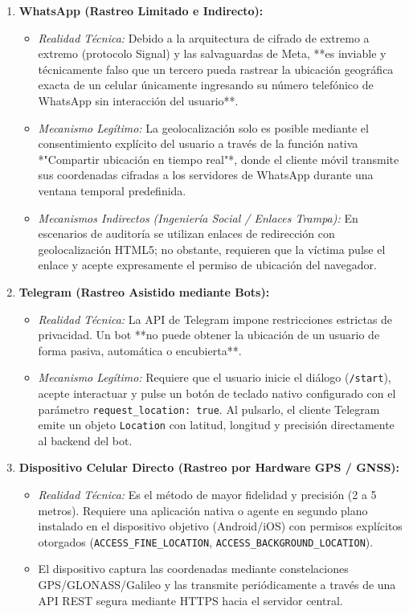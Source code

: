 \documentclass[11pt,letterpaper]{article}
\begin{document}
\begin{enumerate}
    \item \textbf{WhatsApp (Rastreo Limitado e Indirecto):}
    \begin{itemize}
        \item \textit{Realidad Técnica:} Debido a la arquitectura de cifrado de extremo a extremo (protocolo Signal) y las salvaguardas de Meta, **es inviable y técnicamente falso que un tercero pueda rastrear la ubicación geográfica exacta de un celular únicamente ingresando su número telefónico de WhatsApp sin interacción del usuario**.
        \item \textit{Mecanismo Legítimo:} La geolocalización solo es posible mediante el consentimiento explícito del usuario a través de la función nativa *"Compartir ubicación en tiempo real"*, donde el cliente móvil transmite sus coordenadas cifradas a los servidores de WhatsApp durante una ventana temporal predefinida.
        \item \textit{Mecanismos Indirectos (Ingeniería Social / Enlaces Trampa):} En escenarios de auditoría se utilizan enlaces de redirección con geolocalización HTML5; no obstante, requieren que la víctima pulse el enlace y acepte expresamente el permiso de ubicación del navegador.
    \end{itemize}

    \item \textbf{Telegram (Rastreo Asistido mediante Bots):}
    \begin{itemize}
        \item \textit{Realidad Técnica:} La API de Telegram impone restricciones estrictas de privacidad. Un bot **no puede obtener la ubicación de un usuario de forma pasiva, automática o encubierta**.
        \item \textit{Mecanismo Legítimo:} Requiere que el usuario inicie el diálogo (\texttt{/start}), acepte interactuar y pulse un botón de teclado nativo configurado con el parámetro \texttt{request\_location: true}. Al pulsarlo, el cliente Telegram emite un objeto \texttt{Location} con latitud, longitud y precisión directamente al backend del bot.
    \end{itemize}

    \item \textbf{Dispositivo Celular Directo (Rastreo por Hardware GPS / GNSS):}
    \begin{itemize}
        \item \textit{Realidad Técnica:} Es el método de mayor fidelidad y precisión (2 a 5 metros). Requiere una aplicación nativa o agente en segundo plano instalado en el dispositivo objetivo (Android/iOS) con permisos explícitos otorgados (\texttt{ACCESS\_FINE\_LOCATION}, \texttt{ACCESS\_BACKGROUND\_LOCATION}).
        \item El dispositivo captura las coordenadas mediante constelaciones GPS/GLONASS/Galileo y las transmite periódicamente a través de una API REST segura mediante HTTPS hacia el servidor central.
    \end{itemize}
\end{enumerate}
\end{document}
